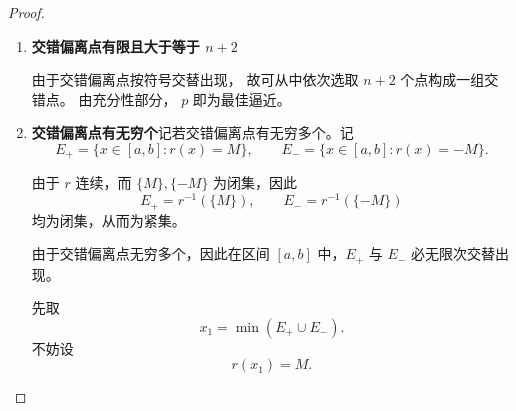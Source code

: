 \begin{proof}
\begin{enumerate}
此时 $-M  \leqslant  r(x) < M-\alpha $  注意到 $\phi(x)$ 与 $r(x)$ 在 $[a, \xi_1]$ 上符号相同。因为
$$
\begin{aligned}
f(x) - q(x) &= f(x) - p(x) - c\phi(x)  \\
              &= r(x) - c\phi(x) \\
              &= r(x) + c|\phi(x)| \\
\end{aligned}$$
这里由于 $r(x)  \leqslant  0$ 并且 $\phi(x)  \leqslant  0$，所以 
当 $c$ 满足 $ 0 < c| \phi(x) |  \leqslant  |c\cdot K| < \frac{\alpha}{2}$ 并且 $c>0$ 时
有
$$
\begin{aligned}
-M  < r(x) - c\phi(x) < M -\alpha + \frac{\alpha}{2} \\ 
\end{aligned}
$$
同理，在区间 $[\xi_1, \xi_2]$ 上我们能够利用
$$
\begin{aligned}
 -M +\alpha < r(x)  \leqslant  M
\end{aligned}
$$
和
$$
\begin{aligned}
f(x) - q(x) &= f(x) - p(x) - c\phi(x)  \\
              &= r(x) - c\phi(x) \\
              &= r(x) - c|\phi(x)| \\
\end{aligned}
$$
得到
$$
\begin{aligned}
-M + \alpha - \frac{\alpha}{2} < r(x) - c\phi(x) < M 
\end{aligned}$$
注意到上述过程与子区间的选择无关，因此在每个子区间上都满足上述不等式。
从而有 $$\|f-q\| < M = \|f-p\|$$，并且根据 $q$ 的构造可以得知它是不超过$n$ 次的多项式，
于是与 $\|f-q\| < \|f-p\|$矛盾。

\item \textbf{交错偏离点有限且大于等于 $n+2$} 

由于交错偏离点按符号交替出现，
故可从中依次选取
$n+2$
个点构成一组交错点。
由充分性部分，
$p$
即为最佳逼近。

\item \textbf{交错偏离点有无穷个}记若交错偏离点有无穷多个。记
$$
E_+=\{x\in[a,b]:r(x)=M\},\qquad
E_-=\{x\in[a,b]:r(x)=-M\}.
$$

由于 $r$ 连续，而 $\{M\},\{-M\}$ 为闭集，因此
$$
E_+=r^{-1}(\{M\}),\qquad
E_-=r^{-1}(\{-M\})
$$
均为闭集，从而为紧集。

由于交错偏离点无穷多个，因此在区间 $[a,b]$ 中，$E_+$ 与 $E_-$ 必无限次交替出现。

先取
$$
x_1=\min(E_+\cup E_-).
$$
不妨设
$$
r(x_1)=M.
$$


\end{enumerate}
\end{proof}
